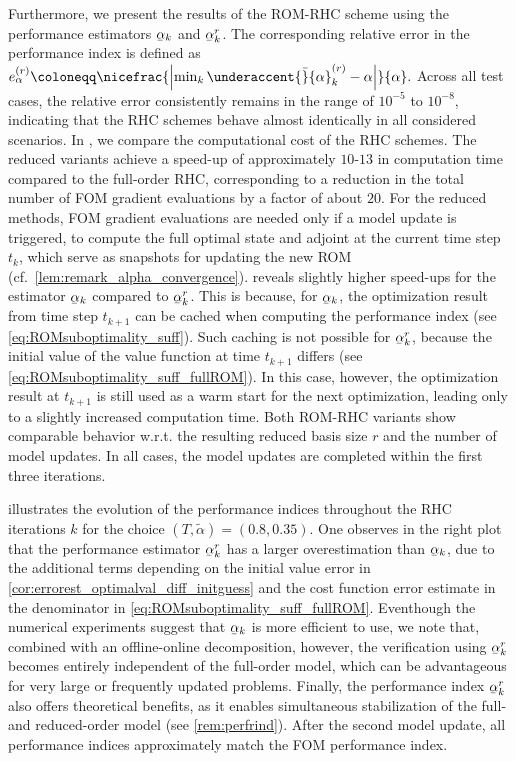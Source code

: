 \documentclass{m2an}
\newcommand{\ubar}[1]{\underaccent{\bar}{#1}}
\begin{document}
%   
Furthermore, we present the results of the ROM-RHC scheme using the performance estimators $\ubar{\alpha}_k$ and $\ubar{\alpha}_k^r$. The corresponding relative error in the performance index is defined as $e^{(r)}_{\alpha} \coloneqq \nicefrac{\left| \min_k\ubar{\alpha}^{(r)}_k - \alpha \right|}{\alpha}.$ Across all test cases, the relative error consistently remains in the range of $10^{-5}$ to $10^{-8}$, indicating that the RHC schemes behave almost identically in all considered scenarios. In , we compare the computational cost of the RHC schemes. The reduced variants achieve a speed-up of approximately $10$-$13$ in computation time compared to the full-order RHC, corresponding to a reduction in the total number of FOM gradient evaluations by a factor of about $20$. For the reduced methods, FOM gradient evaluations are needed only if a model update is triggered, to compute the full optimal state and adjoint at the current time step $t_k$, which serve as snapshots for updating the new ROM (cf.~\cref{lem:remark_alpha_convergence}).  reveals slightly higher speed-ups for the estimator $\ubar{\alpha}_k$ compared to $\ubar{\alpha}_k^r$. This is because, for $\ubar{\alpha}_k$, the optimization result from time step $t_{k+1}$ can be cached when computing the performance index (see \eqref{eq:ROMsuboptimality_suff}). Such caching is not possible for $\ubar{\alpha}_k^r$, because the initial value of the value function at time $t_{k+1}$ differs (see \eqref{eq:ROMsuboptimality_suff_fullROM}). In this case, however, the optimization result at $t_{k+1}$ is still used as a warm start for the next optimization, leading only to a slightly increased computation time. 
Both ROM-RHC variants show comparable behavior w.r.t. the resulting reduced basis size $r$ and the number of model updates. In all cases, the model updates are completed within the first three iterations. 

 illustrates the evolution of the performance indices throughout the RHC iterations $k$ for the choice $(T,\tilde{\alpha}) = (0.8, 0.35)$. One observes in the right plot that the performance estimator $\ubar{\alpha}_k^r$ has a larger overestimation than $\ubar{\alpha}_k$, due to the additional terms depending on the initial value error in \cref{cor:errorest_optimalval_diff_initguess} and the cost function error estimate in the denominator in \eqref{eq:ROMsuboptimality_suff_fullROM}. {Eventhough the numerical experiments suggest that $\ubar \alpha_k$ is more efficient to use, we note that, combined with an offline-online decomposition, however, the verification using $\ubar \alpha_k^r$ becomes entirely independent of the full-order model, which can be advantageous for very large or frequently updated problems. Finally, the performance index $\ubar \alpha_k^r$ also offers theoretical benefits, as it enables simultaneous stabilization of the full- and reduced-order model
(see \cref{rem:perfrind}).} After the second model update, all performance indices approximately match the FOM performance index. 
\end{document}
